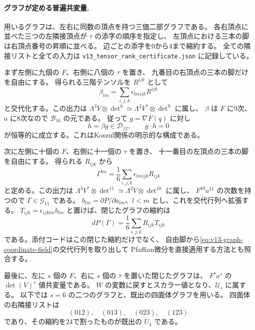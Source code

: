 \paragraph{グラフが定める普遍共変量.}
用いるグラフは、左右に同数の頂点を持つ三価二部グラフである。
各右頂点に並べた三つの左隣接頂点が $\tau$ の添字の順序を指定し、
左頂点における三本の脚は右頂点番号の昇順に並べる。
辺ごとの添字を0から4まで縮約する。
全ての隣接リストと全ての入力は
\texttt{v13\_tensor\_rank\_certificate.json} に記録している。

まず左側に九個の $F$、右側に八個の $\tau$ を置き、
九番目の右頂点の三本の脚だけを自由にする。
得られる三階テンソルを $R^{ijk}$ として
\[
 \beta_{lm}=\sum_{i,j,k}\epsilon_{lmijk}R^{ijk}
\]
と交代化する。この出力は
$\Lambda^3V\otimes\det^8\simeq\Lambda^2V^*\otimes\det^9$ に属し、
$\beta$ は $F$ に9次、$a$ に8次なので $\mathcal B_{16}$ の元である。
従って $g=\nabla F(q)$ に対し
\[
 h=\beta g\in\mathcal D_{12},\qquad g\cdot h=0
\]
が恒等的に成立する。これはKoszul関係の明示的な構成である。

次に左側に十個の $F$、右側に十一個の $\tau$ を置き、
十一番目の左頂点の三本の脚を自由にする。
得られる $R_{ijk}$ から
\begin{equation}\label{eq:v13-graph-coordinate-field}
 \Gamma^{lm}=\frac16\sum_{i,j,k}\epsilon_{lmijk}R_{ijk}
\end{equation}
と定める。この出力は
$\Lambda^3V^*\otimes\det^{11}\simeq\Lambda^2V\otimes\det^{10}$ に属し、
$F^{10}a^{11}$ の次数を持つので $\Gamma\in\mathcal G_{11}$ である。
$b_{lm}=\partial P/\partial a_{lm}$、$l<m$ とし、これを交代行列へ拡張する。
$T_{ijk}=\epsilon_{ijklm}b_{lm}$ と置けば、閉じたグラフの縮約は
\[
 dP(\Gamma)=\frac16\sum_{i,j,k}R_{ijk}T_{ijk}
\]
である。添付コードはこの閉じた縮約だけでなく、
自由脚から\eqref{eq:v13-graph-coordinate-field}の交代行列を取り出して
Pfaffian微分を直接適用する方法とも照合する。

最後に、左に $s$ 個の $F$、右に $s$ 個の $\tau$ を置いた閉じたグラフは、
$F^sa^s$ の $\det(V)^s$ 値共変量である。
$W$ の変数に戻すとスカラー値となり、$\mathcal U_s$ に属する。
以下では $s=6$ の二つのグラフと、既出の四面体グラフを用いる。
四面体の右隣接リストは
\[
 (012),\quad(013),\quad(023),\quad(123)
\]
であり、その縮約を24で割ったものが既出の $U_4$ である。

